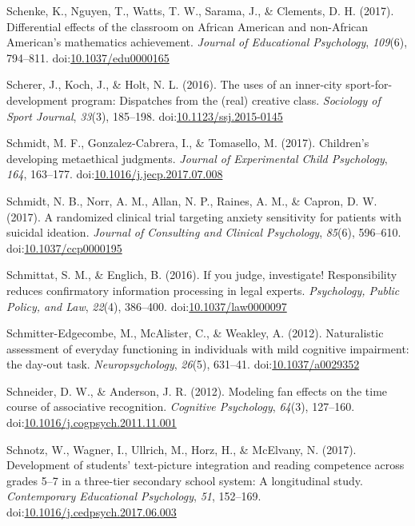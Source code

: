 \documentclass[english,man]{apa6}
\theoremstyle{definition}
\theoremstyle{definition}
\theoremstyle{definition}
\theoremstyle{remark}
\begin{document}
\hypertarget{ref-Schenke2017}{}
Schenke, K., Nguyen, T., Watts, T. W., Sarama, J., \& Clements, D. H.
(2017). Differential effects of the classroom on African American and
non-African American's mathematics achievement. \emph{Journal of
Educational Psychology}, \emph{109}(6), 794--811.
doi:\href{https://doi.org/10.1037/edu0000165}{10.1037/edu0000165}

\hypertarget{ref-Scherer2016}{}
Scherer, J., Koch, J., \& Holt, N. L. (2016). The uses of an inner-city
sport-for-development program: Dispatches from the (real) creative
class. \emph{Sociology of Sport Journal}, \emph{33}(3), 185--198.
doi:\href{https://doi.org/10.1123/ssj.2015-0145}{10.1123/ssj.2015-0145}

\hypertarget{ref-Schmidt2017}{}
Schmidt, M. F., Gonzalez-Cabrera, I., \& Tomasello, M. (2017).
Children's developing metaethical judgments. \emph{Journal of
Experimental Child Psychology}, \emph{164}, 163--177.
doi:\href{https://doi.org/10.1016/j.jecp.2017.07.008}{10.1016/j.jecp.2017.07.008}

\hypertarget{ref-Schmidt2017a}{}
Schmidt, N. B., Norr, A. M., Allan, N. P., Raines, A. M., \& Capron, D.
W. (2017). A randomized clinical trial targeting anxiety sensitivity for
patients with suicidal ideation. \emph{Journal of Consulting and
Clinical Psychology}, \emph{85}(6), 596--610.
doi:\href{https://doi.org/10.1037/ccp0000195}{10.1037/ccp0000195}

\hypertarget{ref-Schmittat2016}{}
Schmittat, S. M., \& Englich, B. (2016). If you judge, investigate!
Responsibility reduces confirmatory information processing in legal
experts. \emph{Psychology, Public Policy, and Law}, \emph{22}(4),
386--400.
doi:\href{https://doi.org/10.1037/law0000097}{10.1037/law0000097}

\hypertarget{ref-Schmitter-Edgecombe2012}{}
Schmitter-Edgecombe, M., McAlister, C., \& Weakley, A. (2012).
Naturalistic assessment of everyday functioning in individuals with mild
cognitive impairment: the day-out task. \emph{Neuropsychology},
\emph{26}(5), 631--41.
doi:\href{https://doi.org/10.1037/a0029352}{10.1037/a0029352}

\hypertarget{ref-Schneider2012}{}
Schneider, D. W., \& Anderson, J. R. (2012). Modeling fan effects on the
time course of associative recognition. \emph{Cognitive Psychology},
\emph{64}(3), 127--160.
doi:\href{https://doi.org/10.1016/j.cogpsych.2011.11.001}{10.1016/j.cogpsych.2011.11.001}

\hypertarget{ref-Schnotz2017}{}
Schnotz, W., Wagner, I., Ullrich, M., Horz, H., \& McElvany, N. (2017).
Development of students' text-picture integration and reading competence
across grades 5--7 in a three-tier secondary school system: A
longitudinal study. \emph{Contemporary Educational Psychology},
\emph{51}, 152--169.
doi:\href{https://doi.org/10.1016/j.cedpsych.2017.06.003}{10.1016/j.cedpsych.2017.06.003}
\end{document}
